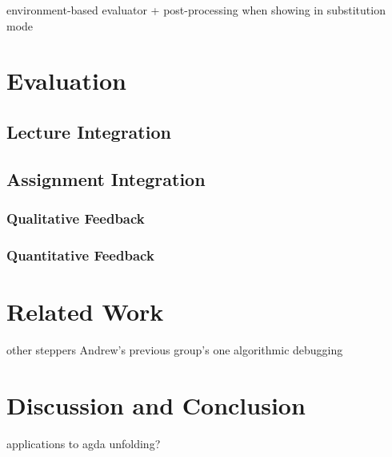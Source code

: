 environment-based evaluator + post-processing when showing in substitution mode

\section{Evaluation}

\subsection{Lecture Integration}

\subsection{Assignment Integration}
\subsubsection{Qualitative Feedback}
\subsubsection{Quantitative Feedback}

\section{Related Work}
other steppers
Andrew's previous group's one
algorithmic debugging

\section{Discussion and Conclusion}

applications to agda unfolding?





\endinput

